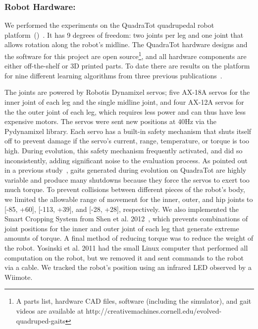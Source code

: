 \subsubsection{Robot Hardware:}

We performed the experiments on the QuadraTot quadrupedal robot platform~()~\cite{yos:clune}.
It has 9 degrees of freedom: two joints per leg and one joint that allows rotation along the robot's midline. %
The QuadraTot hardware designs and the software for this project are open source\footnote{A parts list, hardware CAD files, software (including the simulator), and gait videos are available at http://creativemachines.cornell.edu/evolved-quadruped-gaits}, and all hardware components are either off-the-shelf or 3D printed parts. %
To date there are results on the platform for nine different learning algorithms from three previous publications~\cite{yos:clune,glette,haocheng}. 


The joints are powered by Robotis Dynamixel servos; five AX-18A servos for the inner joint of each leg and the single midline joint, and four AX-12A servos for the the outer joint of each leg, which requires less power and can thus have less expensive motors. The servos were sent new positions at 40Hz via the Pydynamixel library. Each servo has a built-in safety mechanism that shuts itself off to prevent damage if the servo's current, range, temperature, or torque is too high. During evolution, this safety mechanism frequently activated, and did so inconsistently, adding significant noise to the evaluation process. As pointed out in a previous study~\cite{yos:clune}, gaits generated during evolution on QuadraTot are highly variable and produce many shutdowns because they force the servos to exert too much torque.
To prevent collisions between different pieces of the robot's body, we limited the allowable range of movement for the inner, outer, and hip joints to [-85\degree, +60\degree], [-113\degree, +39\degree], and [-28\degree, +28\degree], respectively. We also implemented the Smart Cropping System from Shen et al. 2012~\cite{haocheng}, which prevents combinations of joint positions for the inner and outer joint of each leg that generate extreme amounts of torque. A final method of reducing torque was to reduce the weight of the robot. Yosinski et al. 2011 had the small Linux computer that performed all computation on the robot, but we removed it and sent commands to the robot via a cable. We tracked the robot's position using an infrared LED observed by a Wiimote.
